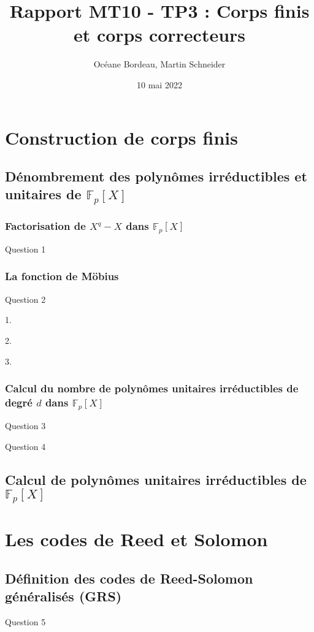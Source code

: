 \documentclass[titlepage]{article}
\title{Rapport MT10 - TP3 : Corps finis et corps correcteurs}
\author{Océane Bordeau, Martin Schneider}
\date{10 mai 2022}
\begin{document}
    \maketitle
    \tableofcontents
    \pagebreak
    \section{Construction de corps finis}
        \setcounter{subsection}{2}
        \subsection{Dénombrement des polynômes irréductibles et unitaires de $\mathbb{F}_p[X]$}
            \subsubsection{Factorisation de $X^q-X$ dans $\mathbb{F}_p[X]$}
            Question 1
            \subsubsection{La fonction de Möbius}
            Question 2

            1.
            
            2.
            
            3.
            
            \subsubsection{Calcul du nombre de polynômes unitaires irréductibles de degré $d$ dans $\mathbb{F}_p[X]$}
            Question 3
            
            Question 4
            
        \subsection{Calcul de polynômes unitaires irréductibles de $\mathbb{F}_p[X]$}
    \section{Les codes de Reed et Solomon}
        \subsection{Définition des codes de Reed-Solomon généralisés (GRS)}
        Question 5
        
\end{document}
